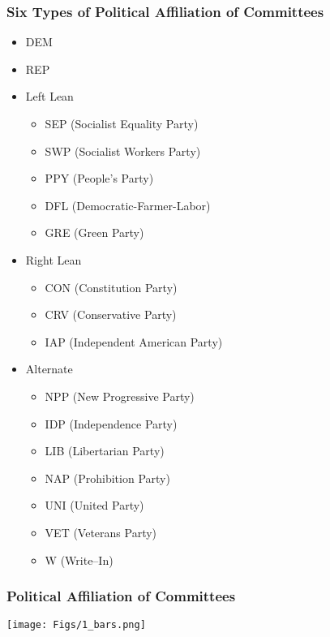 \documentclass{beamer}
\begin{document}
\begin{frame}
\frametitle{Six Types of Political Affiliation of Committees}
\vspace{-0.2cm}
\small %

\begin{itemize}
\item DEM
\item REP
\item Left Lean 
\begin{itemize}
\scriptsize %
\item SEP (Socialist Equality Party)
\item SWP (Socialist Workers Party)
\item PPY (People's Party)
\item DFL (Democratic-Farmer-Labor)
\item GRE (Green Party)
\end{itemize}

\item Right Lean
\begin{itemize}
\scriptsize %
\item CON (Constitution Party)
\item CRV (Conservative Party)
\item IAP (Independent American Party)
\end{itemize}

\item Alternate
\begin{itemize}
\scriptsize %
\item NPP (New Progressive Party)
\item IDP (Independence Party)
\item LIB (Libertarian Party)
\item NAP (Prohibition Party)
\item UNI (United Party)
\item VET (Veterans Party)
\item W (Write--In)
\end{itemize}


\end{itemize}
\end{frame}



\begin{frame}
\frametitle{Political Affiliation of Committees}

\begin{center}
\texttt{[image: Figs/1\_bars.png]} \hspace*{6cm}
\end{center}

\end{frame}
\end{document}
